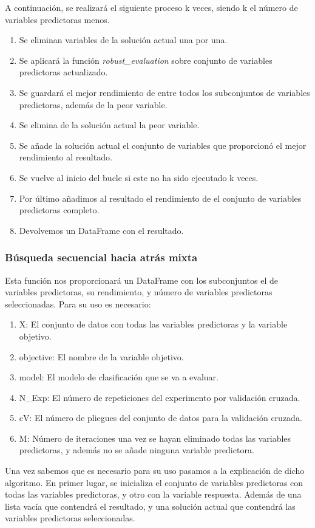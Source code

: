 \documentclass[conference,a4paper]{IEEEtran}
\begin{document}
  A continuación, se realizará el siguiente proceso k veces, siendo k el número de variables predictoras menos.
  \begin{enumerate}
    \item Se eliminan variables de la solución actual una por una.
    \item Se aplicará la función \emph{robust\_evaluation} sobre conjunto de variables predictoras actualizado.
    \item Se guardará el mejor rendimiento de entre todos los subconjuntos de variables predictoras, además de la peor variable.
    \item Se elimina de la solución actual la peor variable.
    \item Se añade la solución actual el conjunto de variables que proporcionó el mejor rendimiento al resultado.
    \item Se vuelve al inicio del bucle si este no ha sido ejecutado k veces.
    \item Por último añadimos al resultado el rendimiento de el conjunto de variables predictoras completo.
    \item Devolvemos un DataFrame con el resultado.
  \end{enumerate}

  \subsubsection*{Búsqueda secuencial hacia atrás mixta} 
  Esta función nos proporcionará un DataFrame con los subconjuntos el de variables predictoras, su rendimiento, y 
  número de variables predictoras seleccionadas.
  Para su uso es necesario:
  \begin{enumerate}
    \item X: El conjunto de datos con todas las variables predictoras y la variable objetivo.
    \item objective: El nombre de la variable objetivo.
    \item model: El modelo de clasificación que se va a evaluar.
    \item N\_Exp: El número de repeticiones del experimento por validación cruzada.
    \item cV: El número de pliegues del conjunto de datos para la validación cruzada.
    \item M: Número de iteraciones una vez se hayan eliminado todas las variables predictoras, 
    y además no se añade ninguna variable predictora.
  \end{enumerate}
  Una vez sabemos que es necesario para su uso pasamos a la explicación de dicho algoritmo.
  En primer lugar, se inicializa el conjunto de variables predictoras con todas las variables predictoras,
  y otro con la variable respuesta. Además de una lista vacía que contendrá el resultado, y una solución
  actual que contendrá las variables predictoras seleccionadas.
\end{document}
